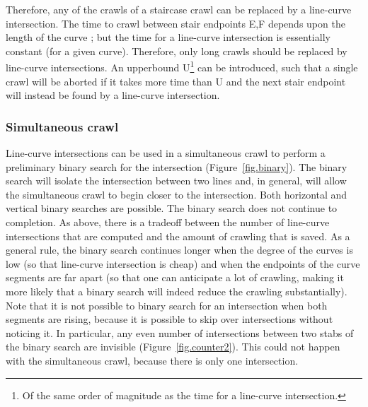 %
%
%
Therefore, any of the crawls of a staircase crawl can be replaced by a 
line-curve intersection.
The time to crawl between stair endpoints E,F depends upon the length of the
curve ; but the time for a line-curve intersection is essentially
constant (for a given curve).
Therefore, only long crawls should be replaced by line-curve intersections.
An upperbound U\footnote{Of the same order of magnitude as the time for a 
	line-curve intersection.}
can be introduced, such that a single crawl will be aborted if it takes
more time than U and the next stair endpoint will instead be found by a 
line-curve intersection.
%
\subsubsection{Simultaneous crawl}
%
Line-curve intersections can be used in a simultaneous crawl 
to perform a preliminary binary search for the intersection
(Figure~\ref{fig.binary}).
%
%
The binary search will isolate the intersection between two lines and,
in general, will allow the simultaneous crawl to begin closer to the
intersection.
%
Both horizontal and vertical binary searches are possible.
The binary search does not continue to completion.
As above, there is a tradeoff between the number of line-curve intersections
that are computed and the amount of crawling that is saved.
As a general rule, the binary search continues longer when the degree
of the curves is low (so that line-curve intersection is cheap)
and when the endpoints of the curve segments are far apart  
(so that one can anticipate a lot of crawling, making it more likely
that a binary search will indeed reduce the crawling substantially).
%
Note that it is not possible to binary search for an intersection when
both segments are rising, because it is possible to skip over intersections 
without noticing it.
In particular, any even number of intersections between two 
stabs of the binary search are invisible (Figure~\ref{fig.counter2}).
This could not happen with the simultaneous crawl, because there is 
only one intersection.
%
%
%

